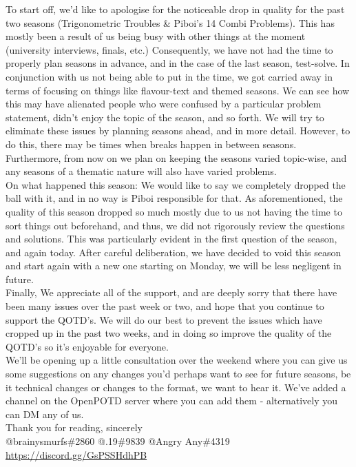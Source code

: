 To start off, we’d like to apologise for the noticeable drop in quality for the past two seasons (Trigonometric Troubles \& Piboi’s 14 Combi Problems). This has mostly been a result of us being busy with other things at the moment (university interviews, finals, etc.) Consequently, we have not had the time to properly plan seasons in advance, and in the case of the last season, test-solve. In conjunction with us not being able to put in the time, we got carried away in terms of focusing on things like flavour-text and themed seasons. We can see how this may have alienated people who were confused by a particular problem statement, didn’t enjoy the topic of the season, and so forth. We will try to eliminate these issues by planning seasons ahead, and in more detail. However, to do this, there may be times when breaks happen in between seasons. Furthermore, from now on we plan on keeping the seasons varied topic-wise, and any seasons of a thematic nature will also have varied problems.\\

On what happened this season: We would like to say we completely dropped the ball with it, and in no way is Piboi responsible for that. As aforementioned, the quality of this season dropped so much mostly due to us not having the time to sort things out beforehand, and thus, we did not rigorously review the questions and solutions. This was particularly evident in the first question of the season, and again today. After careful deliberation, we have decided to void this season and start again with a new one starting on Monday, we will be less negligent in future.\\

Finally, We appreciate all of the support, and are deeply sorry that there have been many issues over the past week or two, and hope that you continue to support the QOTD's. We will do our best to prevent the issues which have cropped up in the past two weeks, and in doing so improve the quality of the QOTD’s so it’s enjoyable for everyone.\\ 

We’ll be opening up a little consultation over the weekend where you can give us some suggestions on any changes you’d perhaps want to see for future seasons, be it technical changes or changes to the format, we want to hear it. We’ve added a channel on the OpenPOTD server where you can add them - alternatively you can DM any of us.\\

Thank you for reading, sincerely \\

@brainysmurfs\#2860  @.19\#9839 @Angry Any\#4319 \\

\url{https://discord.gg/GsPSSHdhPB}